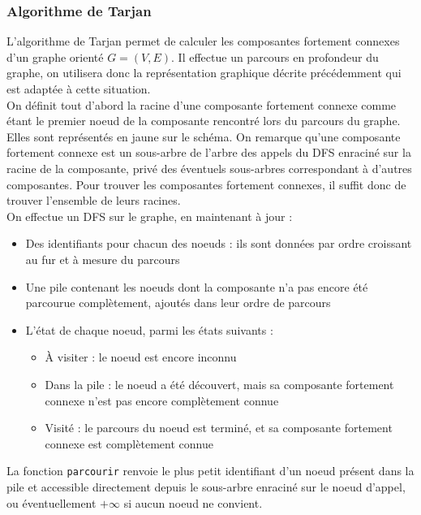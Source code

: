 \documentclass[11pt,a4paper]{article}
\begin{document}
    \subsubsection{Algorithme de Tarjan}
L'algorithme de Tarjan permet de calculer les composantes fortement connexes d'un graphe orienté \(G=(V,E)\). Il effectue un parcours en profondeur du graphe, on utilisera donc la représentation graphique décrite précédemment qui est adaptée à cette situation. \\
On définit tout d'abord la racine d'une composante fortement connexe comme étant le premier noeud de la composante rencontré lors du parcours du graphe. Elles sont représentés en jaune sur le schéma. On remarque qu'une composante fortement connexe est un sous-arbre de l'arbre des appels du DFS enraciné sur la racine de la composante, privé des éventuels sous-arbres correspondant à d'autres composantes. Pour trouver les composantes fortement connexes, il suffit donc de trouver l'ensemble de leurs racines. \\
On effectue un DFS sur le graphe, en maintenant à jour :
\begin{itemize}
  \item Des identifiants pour chacun des noeuds : ils sont données par ordre croissant au fur et à mesure du parcours
  \item Une pile contenant les noeuds dont la composante n'a pas encore été parcourue complètement, ajoutés dans leur ordre de parcours
  \item L'état de chaque noeud, parmi les états suivants :
    \begin{itemize}
      \item À visiter : le noeud est encore inconnu
      \item Dans la pile : le noeud a été découvert, mais sa composante fortement connexe n'est pas encore complètement connue
      \item Visité : le parcours du noeud est terminé, et sa composante fortement connexe est complètement connue
    \end{itemize}
\end{itemize}
La fonction \lstinline|parcourir| renvoie le plus petit identifiant d'un noeud présent dans la pile et accessible directement depuis le sous-arbre enraciné sur le noeud d'appel, ou éventuellement \(+\infty\) si aucun noeud ne convient.
\end{document}
